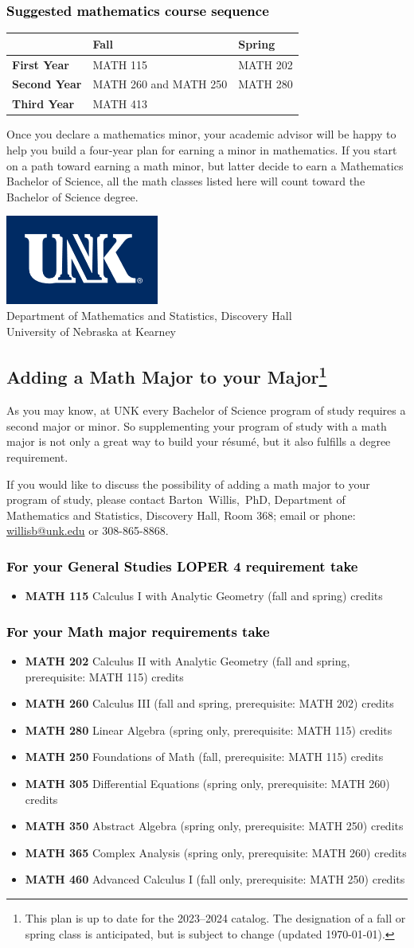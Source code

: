 \documentclass[10pt]{article}
\makeatletter
\newcommand{\calcone}{\textbf{MATH 115} Calculus I with Analytic Geometry (fall and spring) \dotfill 5 credits}
\newcommand{\calconeshort}{MATH 115}
\newcommand{\calctwo}{\textbf{MATH 202} Calculus II with Analytic Geometry (fall and spring, prerequisite: MATH 115) \dotfill 5 credits }
\newcommand{\calctwoshort}{MATH 202}
\newcommand{\foundations}{\textbf{MATH 250} Foundations of Math (fall, prerequisite: MATH 115)  \dotfill 3 credits}
\newcommand{\foundationsshort}{MATH 250}
\newcommand{\calcthree}{\textbf{MATH 260} Calculus III  (fall and spring, prerequisite: MATH 202) \dotfill 5 credits}
\newcommand{\calcthreeshort}{MATH 260}
\newcommand{\linear}{\textbf{MATH 280} Linear Algebra (spring only, prerequisite: MATH 115) \dotfill 3 credits}
\newcommand{\linearshort}{MATH 280}
\newcommand{\discreteshort}{MATH 413}
\newcommand{\diffeq}{\textbf{MATH 305}	Differential Equations (spring only, prerequisite: MATH 260) \dotfill 	3 credits}
\newcommand{\abstractalgebra}{\textbf{MATH 350}	Abstract Algebra (spring only, prerequisite: MATH 250) \dotfill 	3 credits}
\newcommand{\complex}{\textbf{MATH 365}	Complex Analysis (spring only,  prerequisite: MATH 260) \dotfill 3 credits}
\newcommand{\advancedcalc}{\textbf{MATH 460}	Advanced Calculus I  (fall only,   prerequisite: MATH 250) \dotfill 3 credits}
\newcommand{\contactbw}{\mbox{Barton Willis, PhD}, Department of Mathematics and Statistics,  Discovery Hall, Room 368;
email or phone: \href{mailto:willisb@unk.edu}{willisb@unk.edu} or 308-865-8868.}
\newcommand{\forinfo}[2]{If you would like to discuss the possibility of adding a math {#1} to your {#2}, please contact \contactbw}
\newcommand{\catalog}{2023--2024 }
\newcommand{\LOPER}{LOPER\xspace}
\newcommand{\myfootnote}{\footnote{This plan is up to date for  the \catalog catalog. The designation of a fall or spring class is 
anticipated, but  is subject to change (updated \today).}}
\newcommand{\myheading}{
\begin{flushleft}
\includegraphics[scale=0.35]{unk-logo}\\
\setcounter{footnote}{0}
\vspace{0.25in}
 \textcolor{unkblue}{Department of Mathematics and Statistics, Discovery Hall} \\
  \textcolor{unkblue}{University of Nebraska at Kearney}
\end{flushleft}}
\newcommand{\mathminor}{
   \begin{tabular}[h]{| l | l | l|} 
      \hline
                 & \textbf{Fall}         &  \textbf{Spring}  \\ \hline 
      \textbf{First Year} & \calconeshort & \calctwoshort \\  \hline
      \textbf{Second Year} &  \calcthreeshort{} and \foundationsshort{} &  \linearshort \\ \hline
      \textbf{Third Year} &    \discreteshort              &  \\ \hline
      \end{tabular}}
\makeatother
\begin{document}
\subsubsection*{\textcolor{black}{Suggested mathematics course sequence}}

\mathminor

  \vspace{0.1in}

 \noindent Once you declare a mathematics minor, your academic advisor will be happy to help you build a four-year plan for earning a minor in mathematics.  If you start on a path toward earning a math minor, but latter decide to earn a  Mathematics Bachelor of Science, all the math classes listed here will count toward the Bachelor of Science degree.

   \vspace{0.1in}

\newpage

\myheading


\subsection*{\textbf{\textcolor{unkblue}{Adding a Math Major to your Major\myfootnote}}}

As you may know, at UNK every Bachelor of Science program of study requires a second
major or minor. So supplementing your  program of study with a math major is not only a great
way to build your r\'esum\'e, but it also fulfills a degree requirement.


\forinfo{major}{program of study}

\subsubsection*{\textcolor{black}{For your General Studies \LOPER 4 requirement take}}
\begin{itemize}
\item \calcone
\end{itemize}


\subsubsection*{\textcolor{black}{For your Math major requirements take}}
\begin{itemize}
  \item \calctwo
  \item \calcthree
  \item \linear
\item \foundations
\item \diffeq
\item \abstractalgebra
\item \complex

\item \advancedcalc
\end{itemize}
\end{document}
